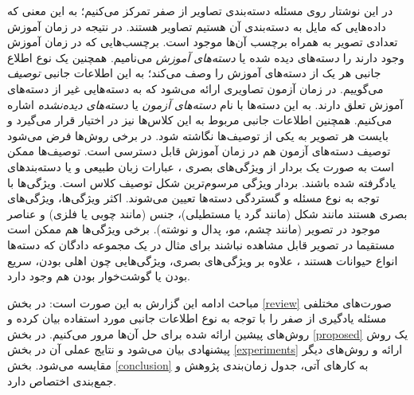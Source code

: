 در این نوشتار روی مسئله دسته‌بندی تصاویر از صفر تمرکز می‌کنیم؛ به این معنی که داده‌هایی که مایل به دسته‌بندی آن هستیم تصاویر هستند. در نتیجه در زمان آموزش تعدادی تصویر به همراه برچسب آن‌ها موجود است. برچسب‌هایی که در زمان آموزش وجود دارند را {\emph دسته‌های دیده شده} یا \emph{ دسته‌های آموزش} می‌نامیم. همچنین یک نوع اطلاع جانبی هر یک از دسته‌های آموزش را وصف می‌کند؛ به این اطلاعات جانبی \emph{ توصیف}  می‌گوییم. در زمان آزمون تصاویری ارائه می‌شود که به دسته‌هایی غیر از دسته‌های آموزش تعلق دارند. به این دسته‌ها با نام\emph{  دسته‌های آزمون}  یا \emph{ دسته‌های دیده‌نشده}  اشاره می‌کنیم. همچنین اطلاعات جانبی مربوط به این کلاس‌ها نیز در اختیار قرار می‌گیرد و بایست هر تصویر به یکی از توصیف‌ها نگاشته شود. در برخی روش‌ها فرض می‌شود توصیف دسته‌های آزمون هم در زمان آموزش قابل دسترسی است. توصیف‌ها ممکن است به صورت یک بردار از ویژگی‌های بصری \cite{farhadi09}،
 عبارات زبان طبیعی 
 \cite{ng13, mohamed13, noroz14}
 و یا دسته‌بندهای یادگرفته شده  \cite{Yu2013} باشند. بردار ویژگی مرسوم‌ترین شکل توصیف کلاس است. ویژگی‌ها با توجه به نوع مسئله و گستردگی دسته‌ها تعیین می‌شوند. اکثر ویژگی‌ها، ویژگی‌های بصری هستند مانند شکل (مانند گرد یا مستطیلی)، جنس (مانند چوبی یا فلزی) و عناصر موجود در تصویر (مانند چشم، مو، پدال و نوشته). برخی ویژگی‌ها هم ممکن است مستقیما در تصویر قابل مشاهده نباشند برای مثال در یک مجموعه دادگان که دسته‌ها انواع حیوانات هستند
 \cite{lampert09}،
 علاوه بر ویژگی‌های بصری، ویژگی‌هایی چون اهلی بودن، سریع‌ بودن یا گوشت‌خوار بودن هم وجود دارد. 
 
مباحث ادامه این گزارش به این صورت است: در بخش \ref{review} صورت‌های مختلفی مسئله یادگیری از صفر را با توجه به نوع اطلاعات جانبی مورد استفاده بیان کرده و روش‌های پیشین ارائه شده برای حل آن‌ها مرور می‌کنیم. در بخش \ref{proposed} یک روش پیشنهادی بیان می‌شود و نتایج عملی آن در بخش \ref{experiments} ارائه و روش‌های دیگر مقایسه می‌شود. بخش \ref{conclusion} به کارهای آتی، جدول زمان‌بندی پژوهش و جمع‌بندی اختصاص دارد. 


